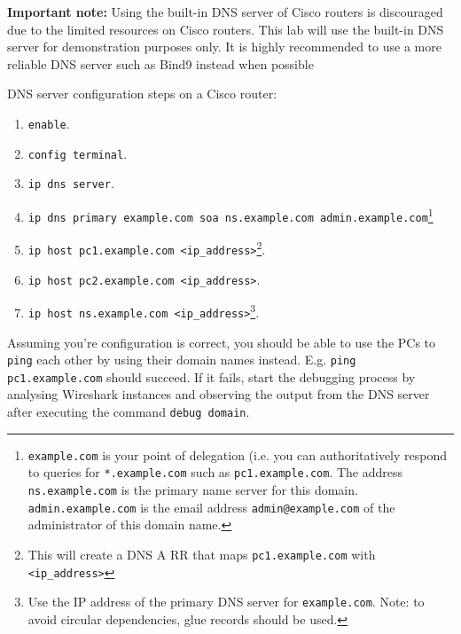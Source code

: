 \documentclass[pdftex,12pt,a4paper]{article}
\begin{document}
            \textbf{Important note:} Using the built-in DNS server of Cisco routers is
            discouraged due to the limited resources on Cisco routers. This lab
            will use the built-in DNS server for demonstration purposes only.
            It is highly recommended to use a more reliable DNS server such as
            Bind9 instead when possible
            
            DNS server configuration steps on a Cisco router:
            \begin{enumerate}
                \item \texttt{enable}.
                \item \texttt{config terminal}.
                \item \texttt{ip dns server}.
                \item \texttt{ip dns primary example.com soa ns.example.com
                    admin.example.com}\footnote{\texttt{example.com} is your
                    point of delegation (i.e. you can authoritatively respond
                    to queries for \texttt{*.example.com} such as
                    \texttt{pc1.example.com}. The address
                    \texttt{ns.example.com} is the primary name server for this
                    domain. \texttt{admin.example.com} is the email address
                    \texttt{admin@example.com} of the administrator of this domain
                    name.}
                \item \texttt{ip host pc1.example.com
                    <ip\_address>}\footnote{This will create a DNS A RR that
                        maps \texttt{pc1.example.com} with
                    \texttt{<ip\_address>}}.
                \item \texttt{ip host pc2.example.com <ip\_address>}.
                \item \texttt{ip host ns.example.com
                    <ip\_address>}\footnote{Use the IP address of the primary
                    DNS server for \texttt{example.com}. Note: to avoid
                    circular dependencies, glue records should be used.}.
            \end{enumerate}
            
            Assuming you're configuration is correct, you should be able to
            use the PCs to \texttt{ping} each other by using their domain names
            instead. E.g. \texttt{ping pc1.example.com} should succeed. If it
            fails, start the debugging process by analysing Wireshark instances
            and observing the output from the DNS server after executing the
            command \texttt{debug domain}.
\end{document}
